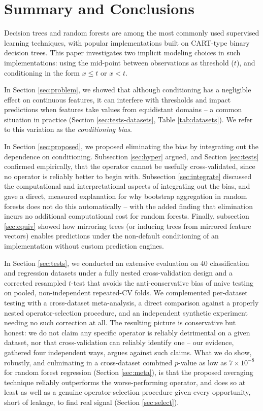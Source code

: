 \documentclass[5p,twocolumn,authoryear]{elsarticle}
\theoremstyle{plain}%
\theoremstyle{remark}%
\theoremstyle{definition}%
\begin{document}
\section{Summary and Conclusions}
\label{sec:summary}

Decision trees and random forests are among the most commonly used supervised learning techniques, with popular implementations \citep{sklearn, tree} built on CART-type binary decision trees. This paper investigates two implicit modeling choices in such implementations: using the mid-point between observations as threshold ($t$), and conditioning in the form $x\leq t$ or $x<t$.

In Section \ref{sec:problem}, we showed that although conditioning has a negligible effect on continuous features, it can interfere with thresholds and impact predictions when features take values from equidistant domains -- a common situation in practice (Section \ref{sec:tests-datasets}, Table \ref{tab:datasets}). We refer to this variation as the \emph{conditioning bias}.

In Section \ref{sec:proposed}, we proposed eliminating the bias by integrating out the dependence on conditioning. Subsection \ref{sec:hyper} argued, and Section \ref{sec:tests} confirmed empirically, that the operator cannot be usefully cross-validated, since no operator is reliably better to begin with. Subsection \ref{sec:integrate} discussed the computational and interpretational aspects of integrating out the bias, and gave a direct, measured explanation for why bootstrap aggregation in random forests does not do this automatically -- with the added finding that elimination incurs no additional computational cost for random forests. Finally, subsection \ref{sec:equiv} showed how mirroring trees (or inducing trees from mirrored feature vectors) enables predictions under the non-default conditioning of an implementation without custom prediction engines.

In Section \ref{sec:tests}, we conducted an extensive evaluation on 40 classification and regression datasets under a fully nested cross-validation design and a corrected resampled $t$-test that avoids the anti-conservative bias of naive testing on pooled, non-independent repeated-CV folds. We complemented per-dataset testing with a cross-dataset meta-analysis, a direct comparison against a properly nested operator-selection procedure, and an independent synthetic experiment needing no such correction at all. The resulting picture is conservative but honest: we do not claim any specific operator is reliably detrimental on a given dataset, nor that cross-validation can reliably identify one -- our evidence, gathered four independent ways, argues against such claims. What we do show, robustly, and culminating in a cross-dataset combined $p$-value as low as $7\times10^{-8}$ for random forest regression (Section \ref{sec:meta}), is that the proposed averaging technique reliably outperforms the worse-performing operator, and does so at least as well as a genuine operator-selection procedure given every opportunity, short of leakage, to find real signal (Section \ref{sec:select}).
\end{document}

